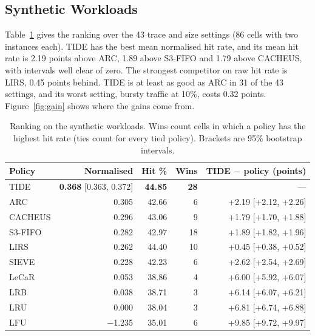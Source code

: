 \documentclass{llncs}
\begin{document}
\subsection{Synthetic Workloads}

Table~\ref{tab:summary} gives the ranking over the 43 trace and size settings (86 cells with two instances each). TIDE has the best mean normalised hit rate, and its mean hit rate is 2.19 points above ARC, 1.89 above S3-FIFO and 1.79 above CACHEUS, with intervals well clear of zero. The strongest competitor on raw hit rate is LIRS, 0.45 points behind. TIDE is at least as good as ARC in 31 of the 43 settings, and its worst setting, bursty traffic at 10\%, costs 0.32 points. Figure~\ref{fig:gain} shows where the gains come from.

\begin{table}[htbp]
\centering
\caption{Ranking on the synthetic workloads. Wins count cells in which a policy has the highest hit rate (ties count for every tied policy). Brackets are 95\% bootstrap intervals.}
\label{tab:summary}
\setlength{\tabcolsep}{4pt}
\begin{tabular}{lrrrr}
\toprule
Policy & Normalised & Hit \% & Wins & TIDE $-$ policy (points) \\
\midrule
TIDE & \textbf{0.368} [0.363, 0.372] & \textbf{44.85} & \textbf{28} & --- \\
ARC & 0.305 & 42.66 & 6 & +2.19 [+2.12, +2.26] \\
CACHEUS & 0.296 & 43.06 & 9 & +1.79 [+1.70, +1.88] \\
S3-FIFO & 0.282 & 42.97 & 18 & +1.89 [+1.82, +1.96] \\
LIRS & 0.262 & 44.40 & 10 & +0.45 [+0.38, +0.52] \\
SIEVE & 0.228 & 42.23 & 6 & +2.62 [+2.54, +2.69] \\
LeCaR & 0.053 & 38.86 & 4 & +6.00 [+5.92, +6.07] \\
LRB & 0.038 & 38.71 & 3 & +6.14 [+6.07, +6.21] \\
LRU & 0.000 & 38.04 & 3 & +6.81 [+6.74, +6.88] \\
LFU & $-$1.235 & 35.01 & 6 & +9.85 [+9.72, +9.97] \\
\bottomrule
\end{tabular}
\end{table}
\end{document}
